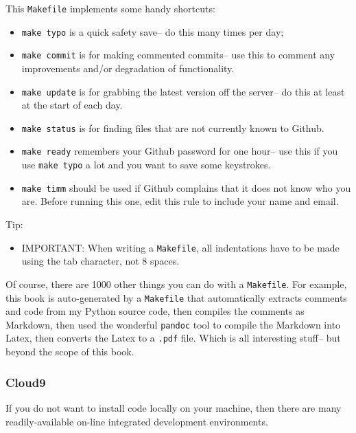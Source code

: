 This \texttt{Makefile} implements some handy shortcuts:

\begin{itemize}
\itemsep1pt\parskip0pt
\item
  \texttt{make\ typo} is a quick safety save-- do this many times per
  day;
\item
  \texttt{make\ commit} is for making commented commits-- use this to
  comment any improvements and/or degradation of functionality.
\item
  \texttt{make\ update} is for grabbing the latest version off the
  server-- do this at least at the start of each day.
\item
  \texttt{make\ status} is for finding files that are not currently
  known to Github.
\item
  \texttt{make\ ready} remembers your Github password for one hour-- use
  this if you use \texttt{make\ typo} a lot and you want to save some
  keystrokes.
\item
  \texttt{make\ timm} should be used if Github complains that it does
  not know who you are. Before running this one, edit this rule to
  include your name and email.
\end{itemize}

Tip:

\begin{itemize}
\itemsep1pt\parskip0pt
\item
  IMPORTANT: When writing a \texttt{Makefile}, all indentations have to
  be made using the tab character, not 8 spaces.
\end{itemize}

Of course, there are 1000 other things you can do with a
\texttt{Makefile}. For example, this book is auto-generated by a
\texttt{Makefile} that automatically extracts comments and code from my
Python source code, then compiles the comments as Markdown, then used
the wonderful \texttt{pandoc} tool to compile the Markdown into Latex,
then converts the Latex to a \texttt{.pdf} file. Which is all
interesting stuff-- but beyond the scope of this book.

\subsubsection{Cloud9}\label{cloud9}

If you do not want to install code locally on your machine, then there
are many readily-available on-line integrated development environments.

